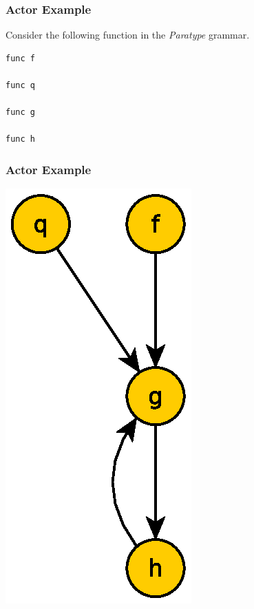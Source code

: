 \documentclass{beamer}
\begin{document}

\begin{frame}[fragile]
  \frametitle{Actor Example}

  Consider the following function in the \emph{Paratype} grammar.
  \begin{lstlisting}[language=Paratype]
func f

func q

func g

func h
  \end{lstlisting}
\end{frame}

\begin{frame}[fragile]
  \frametitle{Actor Example}

  \begin{multicols}{2}
    \begin{center}
      \includegraphics[width=0.7\linewidth]{media/theexamp.eps}
    \end{center}


\end{multicols}
\end{frame}
\end{document}
